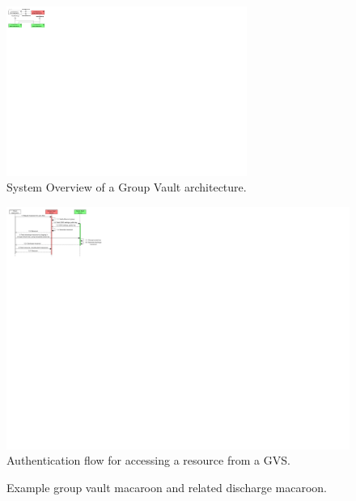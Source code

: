 \begin{figure}[h]
    \centering
    \includegraphics[width=0.7\textwidth]{images/macaroons-solid/ComponentDiagram-Group-Vault-System-Overview.pdf}
    \caption{System Overview of a Group Vault architecture.}
    \label{fig:gv-sys-overview}
\end{figure}

\begin{figure}[h]
    \centering
    \includegraphics[width=1.0\textwidth]{images/macaroons-solid/InteractionDiagram-Group-Vault-Authentication-Flow.pdf}
    \caption{Authentication flow for accessing a resource from a \acrlong{GVS}.}
    \label{fig:gv-macaroon-flow}
\end{figure}

\begin{figure}[H]
    \centering
    
    \caption{Example group vault macaroon and related discharge macaroon.}
    \label{fig:gv-macaroon-example}
\end{figure}

